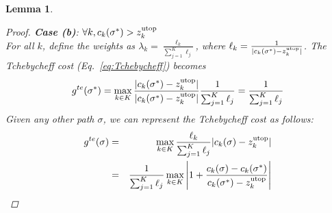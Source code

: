 \documentclass{article}
\newtheorem{lem}{Lemma}
\begin{document}
\begin{lem}
\begin{proof}
\textit{\textbf{Case (b)}}: $\forall k,  c_{k}( \sigma^{*} ) > z^{\rm utop}_{k}$\\
For all $k$, define the weights as
$\lambda_{k} = \frac{ \ell_{k} }{ \sum_{j=1}^K \ell_{j} }$, where
$ \ell_{k} =\frac{1}{| c_{k}(\sigma^*)-z^{\rm utop}_{k} |} $.
The Tchebycheff cost (Eq.~\eqref{eq:Tchebycheff}) becomes
\begin{equation}
\nonumber
\begin{aligned}
	g^{te} ( \sigma^{*} ) %
	= \max_{k \in K}  \frac{| c_{k}( \sigma^* ) - z^{\rm utop}_{k} |}{ | c_{k}( \sigma^* ) - z^{\rm utop}_{k} |} \frac{1}{\sum_{j=1}^K \ell_j} 
	= \frac{1}{\sum_{j=1}^K \ell_j} \\
\end{aligned}
\end{equation}
%
Given any other path $ \sigma $, we can represent the Tchebycheff cost as follows:
\begin{eqnarray*}
 g^{te} ( \sigma )%
 &=& \max_{k\in K} \frac{ \ell_{k} }{ \sum_{j=1}^K \ell_{j} } | c_{k}( \sigma ) - z^{\rm utop}_{k} | \\
 &= & \frac{1}{\sum_{j=1}^K \ell_j} \max_{k \in K} \left| 1 + \frac{ c_{k}( \sigma ) - c_{k} ( \sigma^{*} )  }{  c_{k} ( \sigma^{*} ) - z^{\rm utop}_{k} } \right|

\end{eqnarray*}
\end{proof}
\end{lem}
\end{document}
